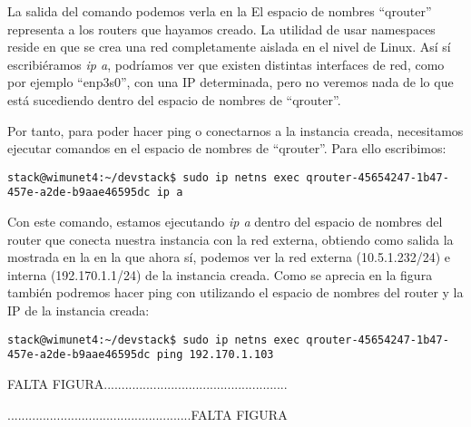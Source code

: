 
La salida del comando podemos verla en la %
El espacio de nombres “qrouter” representa a los routers que hayamos creado. La utilidad de usar namespaces reside en que se crea una red completamente aislada en el nivel de Linux. Así sí escribiéramos \textit{ip a}, podríamos ver que existen distintas interfaces de red, como por ejemplo “enp3s0”, con una IP determinada, pero no veremos nada de lo que está sucediendo dentro del espacio de nombres de “qrouter”.

Por tanto, para poder hacer ping o conectarnos a la instancia creada, necesitamos ejecutar comandos en el espacio de nombres de “qrouter”. Para ello escribimos:

\begin{lstlisting}[style=Consola]
stack@wimunet4:~/devstack$ sudo ip netns exec qrouter-45654247-1b47-457e-a2de-b9aae46595dc ip a
\end{lstlisting}

Con este comando, estamos ejecutando \textit{ip a} dentro del espacio de nombres del router que conecta nuestra instancia con la red externa, obtiendo como salida la mostrada en la %
en la que ahora sí, podemos ver la red externa (10.5.1.232/24) e interna (192.170.1.1/24) de la instancia creada. Como se aprecia en la figura también podremos hacer ping con utilizando el espacio de nombres del router y la IP de la instancia creada:

\begin{lstlisting}[style=Consola]
stack@wimunet4:~/devstack$ sudo ip netns exec qrouter-45654247-1b47-457e-a2de-b9aae46595dc ping 192.170.1.103
\end{lstlisting}

\begin{tcolorbox}[colback=green!5!white,colframe=green!75!black]
FALTA FIGURA....................................................

....................................................FALTA FIGURA
\end{tcolorbox}


\begin{comment}
\begin{figure}
    \centering
    \texttt{[image: imagenes/capitulo8/pingQrotuer.PNG]}
    \caption{Interfaz y ping a la instancia mediante namespaces.}
	\vspace{0.3cm}
    \label{pingQrotuer}
\end{figure}
\end{comment}

